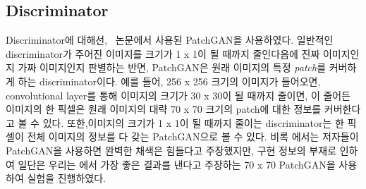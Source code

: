 \subsection{Discriminator}

Discriminator에 대해선, \pixpix~논문에서 사용된 PatchGAN을 사용하였다.
일반적인 discriminator가 주어진 이미지를 크기가 1 x 1이 될 때까지 줄인다음에 진짜 이미지인지 가짜 이미지인지 판별하는 반면, PatchGAN은 원래 이미지의 특정 \textit{patch}를 커버하게 하는 discriminator이다.
예를 들어, 256 x 256 크기의 이미지가 들어오면, convolutional layer를 통해 이미지의 크기가 30 x 30이 될 때까지 줄이면, 이 줄어든 이미지의 한 픽셀은 원래 이미지의 대략 70 x 70 크기의 patch에 대한 정보를 커버한다고 볼 수 있다.
또한,이미지의 크기가 1 x 1이 될 때까지 줄이는 discriminator는 한 픽셀이 전체 이미지의 정보를 다 갖는 PatchGAN으로 볼 수 있다.
비록 \stylepaint 에서는 저자들이 PatchGAN을 사용하면 완벽한 채색은 힘들다고 주장했지만, 구현 정보의 부재로 인하여 일단은 우리는 \pixpix 에서 가장 좋은 결과를 낸다고 주장하는 70 x 70 PatchGAN을 사용하여 실험을 진행하였다.